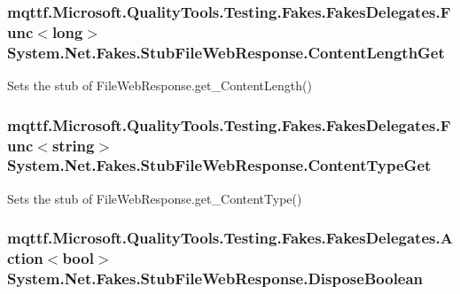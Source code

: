 \hypertarget{class_system_1_1_net_1_1_fakes_1_1_stub_file_web_response_af491171aa4a586a60ef4c5d7b43ac580}{
\subsubsection[{Content\-Length\-Get}]{\setlength{\rightskip}{0pt plus 5cm}mqttf.\-Microsoft.\-Quality\-Tools.\-Testing.\-Fakes.\-Fakes\-Delegates.\-Func$<$long$>$ System.\-Net.\-Fakes.\-Stub\-File\-Web\-Response.\-Content\-Length\-Get}}\label{class_system_1_1_net_1_1_fakes_1_1_stub_file_web_response_af491171aa4a586a60ef4c5d7b43ac580}


Sets the stub of File\-Web\-Response.\-get\-\_\-\-Content\-Length()

\hypertarget{class_system_1_1_net_1_1_fakes_1_1_stub_file_web_response_a353cdade93ba77c2a3719107f3edb3a0}{
\subsubsection[{Content\-Type\-Get}]{\setlength{\rightskip}{0pt plus 5cm}mqttf.\-Microsoft.\-Quality\-Tools.\-Testing.\-Fakes.\-Fakes\-Delegates.\-Func$<$string$>$ System.\-Net.\-Fakes.\-Stub\-File\-Web\-Response.\-Content\-Type\-Get}}\label{class_system_1_1_net_1_1_fakes_1_1_stub_file_web_response_a353cdade93ba77c2a3719107f3edb3a0}


Sets the stub of File\-Web\-Response.\-get\-\_\-\-Content\-Type()

\hypertarget{class_system_1_1_net_1_1_fakes_1_1_stub_file_web_response_a804db4f6d44e017527772a0fe561a3f1}{
\subsubsection[{Dispose\-Boolean}]{\setlength{\rightskip}{0pt plus 5cm}mqttf.\-Microsoft.\-Quality\-Tools.\-Testing.\-Fakes.\-Fakes\-Delegates.\-Action$<$bool$>$ System.\-Net.\-Fakes.\-Stub\-File\-Web\-Response.\-Dispose\-Boolean}}\label{class_system_1_1_net_1_1_fakes_1_1_stub_file_web_response_a804db4f6d44e017527772a0fe561a3f1}


